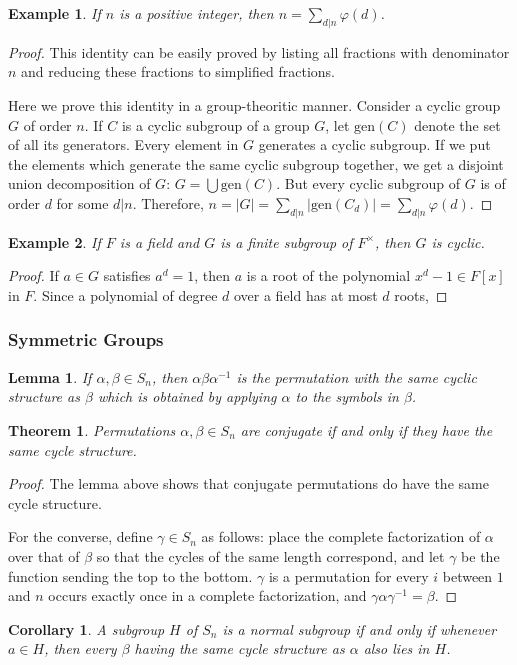 \documentclass{article}
\newtheorem{Thm}{Theorem}[section]
\newtheorem{corollary}{Corollary}[Thm]
\newtheorem{Lem}{Lemma}[section]
\newtheorem{Eg}{Example}[section]
\theoremstyle{definition}
\begin{document}
\begin{Eg}
If $n$ is a positive integer, then $n=\sum_{d|n}\varphi(d)$.
\end{Eg}
\begin{proof}
This identity can be easily proved by listing all fractions with denominator $n$ and reducing these fractions to simplified fractions.\par 
Here we prove this identity in a group-theoritic manner. Consider a cyclic group $G$ of order $n$. If $C$ is a cyclic subgroup of a group $G$, let $\text{gen}(C)$ denote the set of all its generators.
Every element in $G$ generates a cyclic subgroup. If we put the elements which generate the same cyclic subgroup together, we get a disjoint union decomposition of $G$: $G=\bigcup\text{gen}(C)$.
But every cyclic subgroup of $G$ is of order $d$ for some $d|n$. Therefore, $n=\left|G\right|=\sum_{d|n}\left|\text{gen}(C_d)\right|=\sum_{d|n}\varphi(d)$.
\end{proof}

\begin{Eg}
If $F$ is a field and $G$ is a finite subgroup of $F^\times$, then $G$ is cyclic. 
\end{Eg}
\begin{proof}
If $a\in G$ satisfies $a^d=1$, then $a$ is a root of the polynomial $x^d-1\in F\left[x\right]$ in $F$. Since a polynomial of degree $d$ over a field has at most $d$ roots,
\end{proof}


\subsubsection{Symmetric Groups}


\begin{Lem}
If $\alpha,\beta\in S_n$, then $\alpha\beta\alpha^{-1}$ is the permutation with the same cyclic structure as $\beta$ which is obtained by applying $\alpha$ to the symbols in $\beta$.
\end{Lem}

\begin{Thm}
Permutations $\alpha,\beta\in S_n$ are conjugate if and only if they have the same cycle structure.
\end{Thm}
\begin{proof}
The lemma above shows that conjugate permutations do have the same cycle structure.\par 
For the converse, define $\gamma\in S_n$ as follows: place the complete factorization of $\alpha$ over that of $\beta$ so that the cycles of the same length correspond, and let
$\gamma$ be the function sending the top to the bottom. $\gamma$ is a permutation for every $i$ between $1$ and $n$ occurs exactly once in a complete factorization, and $\gamma\alpha\gamma^{-1}=\beta$. 
\end{proof}
\begin{corollary}
A subgroup $H$ of $S_n$ is a normal subgroup if and only if whenever $a\in H$, then every $\beta$ having the same cycle structure as $\alpha$ also lies in $H$.
\end{corollary}
\end{document}
